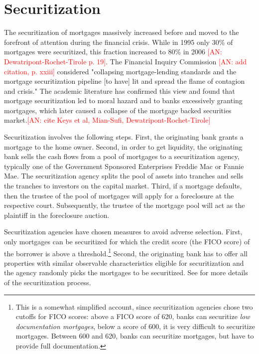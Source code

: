 \documentclass[11pt,twopage]{article}
\newcommand{\AN}[1]{\textcolor{red}{[AN: #1]}}
\begin{document}
\section{Securitization}
\label{sec:securitization}


The securitization of mortgages massively increased before and moved to the forefront of attention during the financial crisis. While in 1995 only 30\% of mortgages were securitized, this fraction increased to 80\% in 2006 \AN{Dewatripont-Rochet-Tirole p. 19}. The Financial Inquiry Commission 
\AN{add citation, p. xxiii} considered "collapsing mortgage-lending standards and the mortgage securitization pipeline [to have] lit and spread the flame of contagion and crisis."  
The academic literature has confirmed this view and found that mortgage securitization led to moral hazard and to banks excessively granting mortgages, which later caused a collapse of the mortgage backed securities market.\AN{cite Keys et al, Mian-Sufi, Dewatripont-Rochet-Tirole} 

Securitization involves the following steps. First, the
originating bank grants a mortgage to the home owner. Second, in order to get
liquidity, the originating bank sells the cash flows from a pool of
mortgages to a securitization agency, typically one of the Government
Sponsored Enterprises Freddie Mac or Fannie Mae. The securitization
agency splits the pool of assets into tranches and sells the tranches
to investors on the capital market. Third, if a mortgage defaults, then the trustee of the pool of mortgages will apply for a foreclosure at the respective court. Subsequently, the trustee of the mortgage pool will act as the plaintiff in the foreclosure auction.

Securitization agencies
have chosen measures to avoid adverse selection. First,
only mortgages can be securitized for which the credit score (the FICO score) of the borrower is above a threshold.\footnote{This is a somewhat simplified account,
	since securitization agencies chose two cutoffs for FICO scores:
	above a FICO score of 620, banks can securitize \emph{low
		documentation mortgages}, below a score of 600, it is very
	difficult to securitize mortgages. Between 600 and 620, banks can
	securitize mortgages, but have to provide full documentation.}
Second, the originating bank has to offer all properties with similar observable characteristics eligible for securitization and the agency
randomly picks the mortgages to be securitized. See \cite{keys2008did} for more details of the securitization process.
\end{document}
